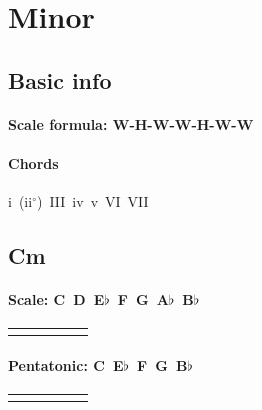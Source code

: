 \documentclass[a4paper,landscape]{article}
\begin{document}
\section{Minor}
\localtableofcontents

\pagebreak

\subsection{Basic info}

\paragraph{Scale formula: W-H-W-W-H-W-W}

\paragraph{Chords}
i~(ii$^\circ$)~III~iv~v~VI~VII

\pagebreak


\subsection{Cm}

\paragraph{Scale: C~D~E$\flat$~F~G~A$\flat$~B$\flat$}
\begin{center}
	\begin{tabular}{ccccc}
		\scales[fingering=minor scale 4, position=III] &
		\scales[fingering=minor scale 5, position=V]   &
		\scales[fingering=minor scale 1, position=VII] &
		\scales[fingering=minor scale 2, position=X]   &
		\scales[fingering=minor scale 3, position=XII]	
	\end{tabular}
\end{center}

\paragraph{Pentatonic: C~E$\flat$~F~G~B$\flat$}
\begin{center}
	\begin{tabular}{ccccc}
		\scales[fingering=minor pent 4, position=III] &
		\scales[fingering=minor pent 5, position=V]   &
		\scales[fingering=minor pent 1, position=VII] &
		\scales[fingering=minor pent 2, position=X]   &
		\scales[fingering=minor pent 3, position=XII]
	\end{tabular}
\end{center}
\end{document}
